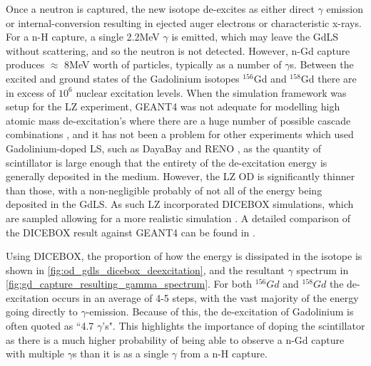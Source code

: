 \par
Once a neutron is captured, the new isotope de-excites as either direct $\gamma$ emission or internal-conversion resulting in ejected auger electrons or characteristic x-rays.
For a n-H capture, a single 2.2MeV $\gamma$ is emitted, which may leave the GdLS without scattering, and so the neutron is not detected.
However, n-Gd capture produces $\approx$ 8MeV worth of particles, typically as a number of $\gamma$s.
Between the excited and ground states of the Gadolinium isotopes ${}^{156}$Gd and ${}^{158}$Gd there are in excess of $10^{6}$ nuclear excitation levels.
When the simulation framework was setup for the LZ experiment, GEANT4 was not adequate for modelling high atomic mass de-excitation's where there are a huge number of possible cascade combinations \cite{ucsb_gdls_dicebox_simulations_ref}, and it has not been a problem for other experiments which used Gadolinium-doped LS, such as DayaBay \cite{dayabay_overview_ref} and RENO \cite{reno_overview_ref}, as the quantity of scintillator is large enough that the entirety of the de-excitation energy is generally deposited in the medium.
However, the LZ OD is significantly thinner than those, with a non-negligible probably of not all of the energy being deposited in the GdLS.
As such LZ incorporated DICEBOX \cite{dicebox_simulations_ref} simulations, which are sampled allowing for a more realistic simulation \cite{lz_simulations_ref}.
A detailed comparison of the DICEBOX result against GEANT4 can be found in \cite{ucsb_gdls_dicebox_simulations_ref}.


\par
Using DICEBOX, the proportion of how the energy is dissipated in the isotope is shown in \autoref{fig:od_gdls_dicebox_deexcitation}, and the resultant $\gamma$ spectrum in \autoref{fig:gd_capture_resulting_gamma_spectrum}.
For both ${}^{156}Gd$ and ${}^{158}Gd$ the de-excitation occurs in an average of 4-5 steps, with the vast majority of the energy going directly to $\gamma$-emission.
Because of this, the de-excitation of Gadolinium is often quoted as ``4.7 $\gamma$'s".
This highlights the importance of doping the scintillator as there is a much higher probability of being able to observe a n-Gd capture with multiple $\gamma$s than it is as a single $\gamma$ from a n-H capture.



